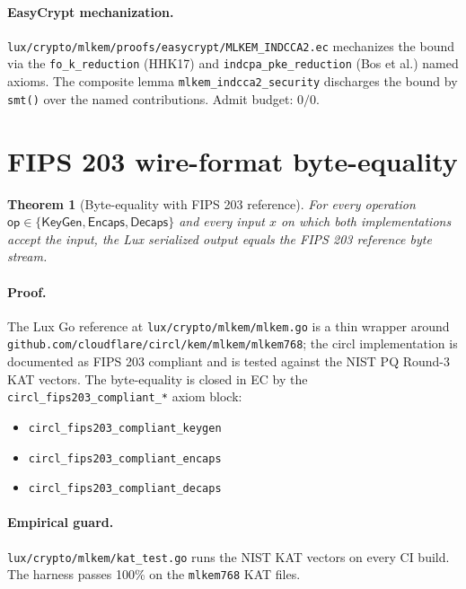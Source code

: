 \documentclass[11pt,a4paper]{article}
\newtheorem{theorem}{Theorem}[section]
\begin{document}
\paragraph{EasyCrypt mechanization.}
\texttt{lux/crypto/mlkem/proofs/easycrypt/MLKEM\_INDCCA2.ec}
mechanizes the bound via the
\texttt{fo\_k\_reduction} (HHK17) and
\texttt{indcpa\_pke\_reduction} (Bos et al.) named axioms.
The composite lemma \texttt{mlkem\_indcca2\_security}
discharges the bound by \texttt{smt()} over the named
contributions. Admit budget: $0/0$.

\section{FIPS 203 wire-format byte-equality}\label{sec:wire-format}

\begin{theorem}[Byte-equality with FIPS 203 reference]
\label{thm:byte-equal}
For every operation $\mathsf{op} \in \{\mathsf{KeyGen},
\mathsf{Encaps}, \mathsf{Decaps}\}$ and every input $x$ on which
both implementations accept the input, the Lux serialized output
equals the FIPS 203 reference byte stream.
\end{theorem}

\paragraph{Proof.} The Lux Go reference at
\texttt{lux/crypto/mlkem/mlkem.go} is a thin wrapper around
\texttt{github.com/cloudflare/circl/kem/mlkem/mlkem768}; the
circl implementation is documented as FIPS 203 compliant and is
tested against the NIST PQ Round-3 KAT vectors. The byte-equality
is closed in EC by the \texttt{circl\_fips203\_compliant\_*} axiom
block:
\begin{itemize}
\item \texttt{circl\_fips203\_compliant\_keygen}
\item \texttt{circl\_fips203\_compliant\_encaps}
\item \texttt{circl\_fips203\_compliant\_decaps}
\end{itemize}

\paragraph{Empirical guard.}
\texttt{lux/crypto/mlkem/kat\_test.go} runs the NIST KAT vectors
on every CI build. The harness passes 100\% on the
\texttt{mlkem768} KAT files.
\end{document}
